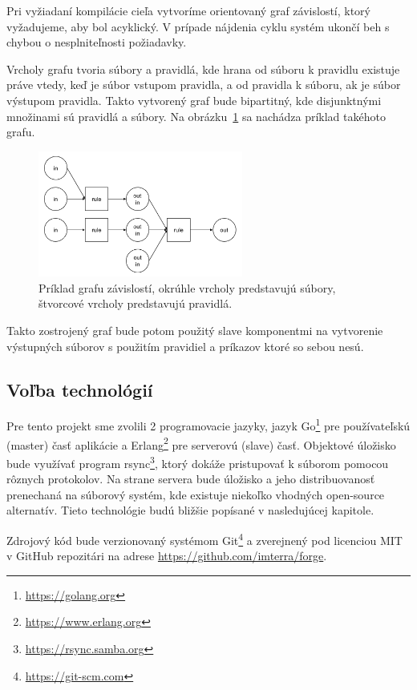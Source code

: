 Pri vyžiadaní kompilácie cieľa vytvoríme orientovaný graf závislostí, ktorý vyžadujeme,
aby bol acyklický. V prípade nájdenia cyklu systém ukončí beh s chybou o nesplniteľnosti
požiadavky.

Vrcholy grafu tvoria súbory a pravidlá, kde hrana od súboru k pravidlu existuje
práve vtedy, keď je súbor vstupom pravidla, a od pravidla k súboru, ak je súbor
výstupom pravidla. Takto vytvorený graf bude bipartitný, kde disjunktnými množinami
sú pravidlá a súbory. Na obrázku~\ref{img:dependency_graph} sa nachádza príklad
takéhoto grafu.

\begin{figure}[h]
  \centerline{\includegraphics[width=0.6\textwidth]{images/dependency_graph}}
  \caption[Graf závislostí]{Príklad grafu závislostí, okrúhle vrcholy predstavujú
  súbory, štvorcové vrcholy predstavujú pravidlá.}
  \label{img:dependency_graph}
\end{figure}

Takto zostrojený graf bude potom použitý slave komponentmi na vytvorenie výstupných
súborov s použitím pravidiel a príkazov ktoré so sebou nesú.

\newpage

\subsection{Vo\v{l}ba technol\'{o}gi\'{i}}
\label{sub:solution:tech}

Pre tento projekt sme zvolili 2 programovacie jazyky, jazyk Go\footnote{\url{https://golang.org}}
pre používateľskú (master) časť aplikácie a Erlang\footnote{\url{https://www.erlang.org}}
pre serverovú (slave) časť. Objektové úložisko bude využívať program rsync\footnote{\url{https://rsync.samba.org}},
ktorý dokáže pristupovať k súborom pomocou rôznych protokolov. Na strane servera bude úložisko
a jeho distribuovanosť prenechaná na súborový systém, kde existuje niekoľko vhodných
open-source alternatív. Tieto technológie budú bližšie popísané v nasledujúcej kapitole.

Zdrojový kód bude verzionovaný systémom Git\footnote{\url{https://git-scm.com}} a
zverejnený pod licenciou MIT v GitHub repozitári na adrese \url{https://github.com/imterra/forge}.
